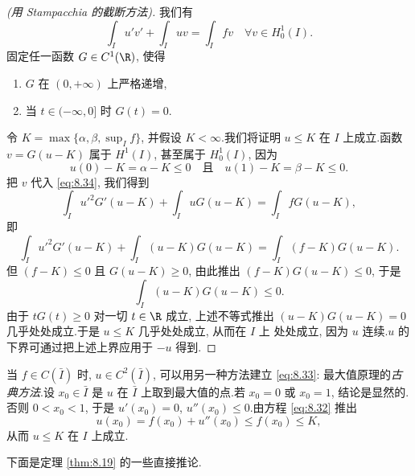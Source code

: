 \begin{proof}[(用 Stampacchia 的截断方法)]
我们有
\begin{equation}
\int_I u'v'+\int_I uv=\int_I fv\quad\forall v\in H_0^1(I).
\label{eq:8.34}
\end{equation}
固定任一函数 $G\in C^1(\R)$, 使得
\begin{enumerate}[label=(\roman*), leftmargin=2.6em, itemsep=0.2em]
	\item $G$ 在 $(0,+\infty)$ 上严格递增,
	\item 当 $t\in(-\infty,0]$ 时 $G(t)=0$.
\end{enumerate}
令 $K=\max\{\alpha,\beta,\sup_I f\}$, 并假设 $K<\infty$.我们将证明
$u\le K$ 在 $I$ 上成立.函数 $v=G(u-K)$ 属于 $H^1(I)$, 甚至属于
$H_0^1(I)$, 因为
\begin{equation*}
u(0)-K=\alpha-K\le0\quad\text{且}\quad u(1)-K=\beta-K\le0.
\end{equation*}
把 $v$ 代入 \eqref{eq:8.34}, 我们得到
\begin{equation*}
\int_I u'^2G'(u-K)+\int_I uG(u-K)=\int_I fG(u-K),
\end{equation*}
即
\begin{equation*}
\int_I u'^2G'(u-K)+\int_I(u-K)G(u-K)=\int_I(f-K)G(u-K).
\end{equation*}
但 $(f-K)\le0$ 且 $G(u-K)\ge0$, 由此推出 $(f-K)G(u-K)\le0$, 于是
\begin{equation*}
\int_I(u-K)G(u-K)\le0.
\end{equation*}
由于 $tG(t)\ge0$ 对一切 $t\in\R$ 成立, 上述不等式推出
$(u-K)G(u-K)=0$ 几乎处处成立.于是 $u\le K$ 几乎处处成立, 从而在 $I$ 上
处处成立, 因为 $u$ 连续.$u$ 的下界可通过把上述上界应用于 $-u$ 得到.
\end{proof}

\begin{remark}
\label{rem:8.26}
当 $f\in C(\bar I)$ 时, $u\in C^2(\bar I)$, 可以用另一种方法建立
\eqref{eq:8.33}: 最大值原理的\emph{古典方法}.设 $x_0\in\bar I$ 是 $u$ 在
$\bar I$ 上取到最大值的点.若 $x_0=0$ 或 $x_0=1$, 结论是显然的.否则
$0<x_0<1$, 于是 $u'(x_0)=0$, $u''(x_0)\le0$.由方程
\eqref{eq:8.32} 推出
\begin{equation*}
u(x_0)=f(x_0)+u''(x_0)\le f(x_0)\le K,
\end{equation*}
从而 $u\le K$ 在 $I$ 上成立.
\end{remark}

下面是定理  \ref{thm:8.19} 的一些直接推论.

